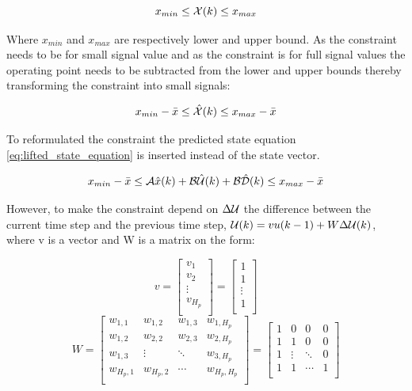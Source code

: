\begin{equation}
    x_{min} \leq \CMcal{X}(k) \leq x_{max}
\end{equation}

Where $x_{min}$ and $x_{max}$ are respectively lower and upper bound. As the constraint needs to be for small signal value and as the constraint is for full signal values the operating point needs to be subtracted from the lower and upper bounds thereby transforming the constraint into small signals:

\begin{equation}
    x_{min}- \bar{x} \leq \hat{\CMcal{X}}(k) \leq x_{max}-\bar{x}
\end{equation}

To reformulated the constraint the predicted state equation \ref{eq:lifted_state_equation} is inserted instead of the state vector.

\begin{equation}
	x_{min}- \bar{x} \leq \CMcal{A}\hat{x}(k)+\CMcal{B}\hat{\CMcal{U}}(k)+\CMcal{B\hat{D}}(k) \leq x_{max}-\bar{x}
 \end{equation} 

However, to make the constraint depend on $\Delta \CMcal{U}$ the difference between the current time step and the previous time step, $\CMcal{U}(k) = vu(k-1) +W\Delta \CMcal{U}(k) $, where v is a vector and W is a matrix on the form: 

\begin{equation}
v=
	\begin{bmatrix}
	  v_1 	\\
	  v_2 	\\
	  \vdots 			\\
	  v_{H_p} 	\\
	  \end{bmatrix}
	  = 
	  \begin{bmatrix}
	  1 	\\
	  1 	\\
	  \vdots 			\\
	  1 	\\
	  \end{bmatrix}
\end{equation}
\begin{equation}
	W=	  
\begin{bmatrix}
	  w_{1,1}  & w_{1,2} & w_{1,3} & w_{1,H_p} 	\\
	  w_{1,2}  & w_{2,2} & w_{2,3} & w_{2,H_p} 	\\
	  w_{1,3}  & \vdots & \ddots & w_{3,H_p}		\\
	  w_{H_p,1} & w_{H_p,2} & \cdots & w_{H_p,H_p} 	\\
	  \end{bmatrix}=
	  \begin{bmatrix}
	  1 & 0 & 0 & 0 	\\
	  1 & 1 & 0 & 0 	\\
	  1 & \vdots & \ddots & 0		\\
	  1 & 1 & \cdots & 1 	\\
	  \end{bmatrix}
\end{equation}


